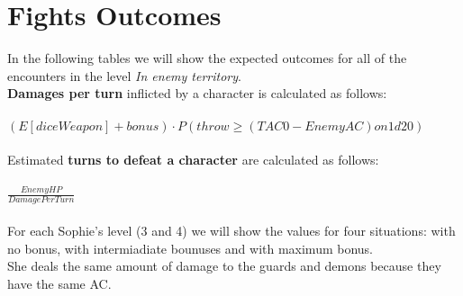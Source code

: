 \section{Fights Outcomes}
In the following tables we will show the expected outcomes for all of the encounters in the level \textit{In enemy territory}. \\
\textbf{Damages per turn} inflicted by a character is calculated as follows:\\\\
$(E[diceWeapon] + bonus) \cdot P(throw \ge (TAC0 - EnemyAC) on 1d20)$\\\\
Estimated \textbf{turns to defeat a character} are calculated as follows:\\\\
$\frac{EnemyHP}{DamagePerTurn}$\\\\
For each Sophie's level (3 and 4) we will show the values for four situations: with no bonus, with intermiadiate bounuses and
with maximum bonus.\\
She deals the same amount of damage to the guards and demons because they have the same AC. 
